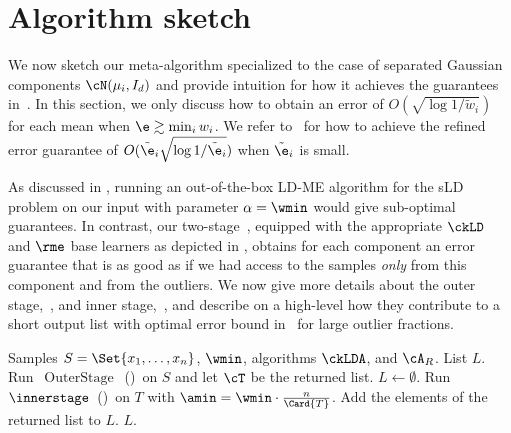 \section{Algorithm sketch}
\label{sec:proof_sketch}

We now sketch our meta-algorithm specialized to the case of separated Gaussian components $\cN(\mu_i,I_d)$ and provide intuition for how it achieves the guarantees in~.
In this section, we only discuss how to obtain an error of $O(\sqrt{\log 1/\tilde{w}_i})$ for each mean when  %
\(\e \gtrsim \min_i w_i\).
We refer to~ for how to achieve the refined error guarantee of $O(\tilde{\e}_i\sqrt{\log 1/\tilde{\e}_i})$ when $\tilde{\e}_i$ is small.

As discussed in , running an out-of-the-box LD-ME algorithm for the sLD problem on our input with parameter $\alpha = \wmin$ would give sub-optimal guarantees.
In contrast, our two-stage~, equipped with the appropriate $\ckLD$ and $\rme$ base learners as depicted in , obtains for each component an error guarantee that is as good as if we had access to the samples \textit{only} from this component and from the outliers. 
We now give more details about the outer stage,~, and inner stage,~, and describe on a high-level how they contribute to a short output list with optimal error bound in~ for large outlier fractions. 


\begin{algorithm}[t]
\caption{\(\operatorname{FullAlgorithm}\)}
    \label{alg:full_alg}
    \begin{algorithmic}[1]
    \Require Samples $S = \Set{x_1, \ldots, x_{n}}$, \(\wmin\), algorithms $\ckLDA$, and $\cA_{R}$.
    \Ensure List \(L\).
    \State Run~\(\operatorname{OuterStage}\)~()~on \(S\) and let \(\cT\) be the returned list.
    \State \(L \gets \emptyset\).
        \State Run~\(\innerstage\)~()~on \(T\) with \(\amin = \wmin \cdot \frac{n}{\Card{T}}\).
        \State Add the elements of the returned list to \(L\).
    \EndFor
    \State \Return \(L\).
    \end{algorithmic}
\end{algorithm}

